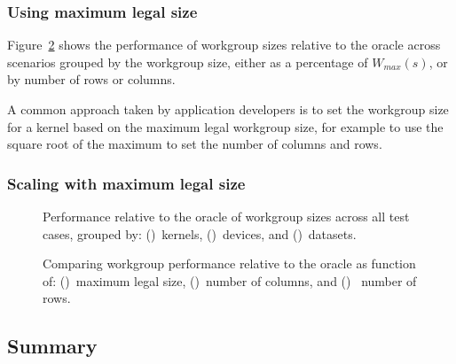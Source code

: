 \subsubsection{Using maximum legal size}

Figure~\ref{fig:performance-wgsizes} shows the performance of
workgroup sizes relative to the oracle across scenarios grouped by the
workgroup size, either as a percentage of $W_{max}(s)$, or by number
of rows or columns.

A common approach taken by application developers is to set the
workgroup size for a kernel based on the maximum legal workgroup size,
for example to use the square root of the maximum to set the number of
columns and rows.



\subsubsection{Scaling with maximum legal size}



\cleardoublepage%
\begin{figure}

\caption{%
  Performance relative to the oracle of workgroup sizes across all
  test cases, grouped by: ()~kernels,
  ()~devices, and
  ()~datasets.%
}
\label{fig:performances}
\end{figure}
\newpage
\begin{figure}

\caption{%
  Comparing workgroup performance relative to the oracle as function
  of: ()~maximum legal size,
  ()~number of columns, and
  ()~ number of rows.%
}
\label{fig:performance-wgsizes}
\end{figure}


\subsection{Summary}


